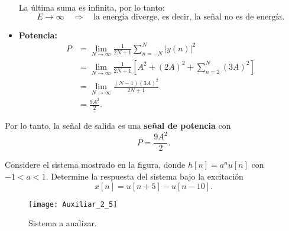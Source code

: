 \documentclass[
  11pt,
  letterpaper,
   addpoints,
  ]{exam}
\begin{document}
\begin{questions}
\begin{solution}
\begin{itemize}
La última suma es infinita, por lo tanto:
\begin{equation}
E \to \infty \quad \Rightarrow \quad \text{la energía diverge, es decir, la señal no es de energía.}
\end{equation}

\item \textbf{Potencia:}  
\begin{align}
P &= \lim_{N\to\infty} \frac{1}{2N+1} \sum_{n=-N}^{N} |y(n)|^2 \\
  &= \lim_{N\to\infty} \frac{1}{2N+1} 
     \left[ A^2 + (2A)^2 + \sum_{n=2}^{N} (3A)^2 \right] \\
  &= \lim_{N\to\infty} \frac{(N-1)(3A)^2}{2N+1} \\
  &= \frac{9A^2}{2}.
\end{align}
\end{itemize}

Por lo tanto, la señal de salida es una \textbf{señal de potencia} con 
\begin{equation}
P = \frac{9A^2}{2}.
\end{equation}
\end{solution}
\question Considere el sistema mostrado en la figura, donde \(h[n]=a^n u[n]\) con \(-1<a<1\). Determine la respuesta del sistema bajo la excitación
\[x[n]=u[n+5]-u[n-10].\]

\begin{figure}[H]
  \centering
  \texttt{[image: Auxiliar\_2\_5]}
  \caption{Sistema a analizar.}
\end{figure}
\begin{solution}

\end{solution}
\end{questions}
\end{document}
